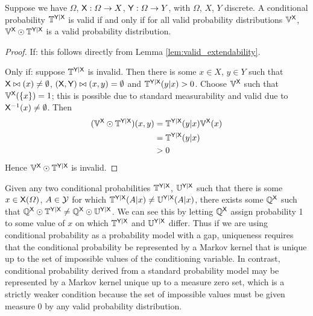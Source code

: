 \begin{theorem}\label{th:valid_conditional_probability}
Suppose we have $\Omega$, $\mathsf{X}:\Omega\to X$, $\mathsf{Y}:\Omega\to Y$, with $\Omega$, $X$, $Y$ discrete. A conditional probability $\mathbb{T}^{\mathsf{Y}|\mathsf{X}}$ is valid if and only if for all valid probability distributions $\mathbb{V}^{\mathsf{X}}$, $\mathbb{V}^{\mathsf{X}}\odot \mathbb{T}^{\mathsf{Y}|\mathsf{X}}$ is a valid probability distribution.
\end{theorem}

\begin{proof}
If: this follows directly from Lemma \ref{lem:valid_extendability}.

Only if: suppose $\mathbb{T}^{\mathsf{Y}|\mathsf{X}}$ is invalid. Then there is some $x\in X$, $y\in Y$ such that $\mathsf{X}\bowtie(x)\neq \emptyset$, $(\mathsf{X},\mathsf{Y})\bowtie(x,y)=\emptyset$ and $\mathbb{T}^{\mathsf{Y}|\mathsf{X}}(y|x)>0$. Choose $\mathbb{V}^{\mathsf{X}}$ such that $\mathbb{V}^{\mathsf{X}}(\{x\})=1$; this is possible due to standard measurability and valid due to $\mathsf{X}^{-1}(x)\neq \emptyset$. Then
\begin{align}
	(\mathbb{V}^{\mathsf{X}}\odot \mathbb{T}^{\mathsf{Y}|\mathsf{X}})(x,y) &= \mathbb{T}^{\mathsf{Y}|\mathsf{X}}(y|x) \mathbb{V}^{\mathsf{X}}(x)\\
																	 &= \mathbb{T}^{\mathsf{Y}|\mathsf{X}}(y|x)\\
																	 &>0
\end{align}
Hence $\mathbb{V}^{\mathsf{X}}\odot \mathbb{T}^{\mathsf{Y}|\mathsf{X}}$ is invalid.
\end{proof}

Given any two conditional probabilities $\mathbb{T}^{\mathsf{Y}|\mathsf{X}}$, $ \mathbb{U}^{\mathsf{Y}|\mathsf{X}}$ such that there is some $x\in \mathsf{X}(\Omega)$, $A\in \mathcal{Y}$ for which $\mathbb{T}^{\mathsf{Y}|\mathsf{X}}(A|x)\neq \mathbb{U}^{\mathsf{Y}|\mathsf{X}}(A|x)$, there exists some $\mathbb{Q}^{\mathsf{X}}$ such that $\mathbb{Q}^{\mathsf{X}}\odot \mathbb{T}^{\mathsf{Y}|\mathsf{X}}\neq \mathbb{Q}^{\mathsf{X}}\odot \mathbb{U}^{\mathsf{Y}|\mathsf{X}}$. We can see this by letting $\mathbb{Q}^{\mathsf{X}}$ assign probability 1 to some value of $x$ on which $\mathbb{T}^{\mathsf{Y}|\mathsf{X}}$ and $\mathbb{U}^{\mathsf{Y}|\mathsf{X}}$ differ. Thus if we are using conditional probability as a probability model with a gap, uniqueness requires that the conditional probability be represented by a Markov kernel that is unique up to the set of impossible values of the conditioning variable. In contrast, conditional probability derived from a standard probability model may be represented by a Markov kernel unique up to a measure zero set, which is a strictly weaker condition because the set of impossible values must be given measure 0 by any valid probability distribution.

